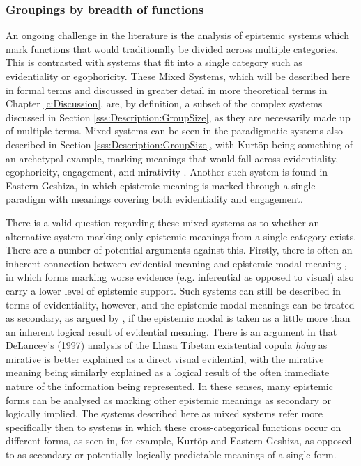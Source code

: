 \subsubsection{Groupings by breadth of functions}\label{sss:Description:MixedSystems}
An ongoing challenge in the literature is the analysis of epistemic systems which mark functions that would traditionally be divided across multiple categories. This is contrasted with systems that fit into a single category such as evidentiality or egophoricity. These Mixed Systems, which will be described here in formal terms and discussed in greater detail in more theoretical terms in Chapter \ref{c:Discussion}, are, by definition, a subset of the complex systems discussed in Section \ref{sss:Description:GroupSize}, as they are necessarily made up of multiple terms. Mixed systems can be seen in the paradigmatic systems also described in Section \ref{sss:Description:GroupSize}, with Kurtöp being something of an archetypal example, marking meanings that would fall across evidentiality, egophoricity, engagement, and mirativity \cite{Hyslop2020Kurtop}. Another such system is found in Eastern Geshiza, in which epistemic meaning is marked through a single paradigm with meanings covering both evidentiality and engagement. 

There is a valid question regarding these mixed systems as to whether an alternative system marking only epistemic meanings from a single category exists. There are a number of potential arguments against this. Firstly, there is often an inherent connection between evidential meaning and epistemic modal meaning \cite{Boye2012}, in which forms marking worse evidence (e.g. inferential as opposed to visual) also carry a lower level of epistemic support. Such systems can still be described in terms of evidentiality, however, and the epistemic modal meanings can be treated as secondary, as argued by , if the epistemic modal is taken as a little more than an inherent logical result of evidential meaning. There is an argument in  that DeLancey's (1997) analysis of the Lhasa Tibetan existential copula \textit{ḥdug} as mirative is better explained as a direct visual evidential, with the mirative meaning being similarly explained as a logical result of the often immediate nature of the information being represented. In these senses, many epistemic forms can be analysed as marking other epistemic meanings as secondary or logically implied. The systems described here as mixed systems refer more specifically then to systems in which these cross-categorical functions occur on different forms, as seen in, for example, Kurtöp and Eastern Geshiza, as opposed to as secondary or potentially logically predictable meanings of a single form.

